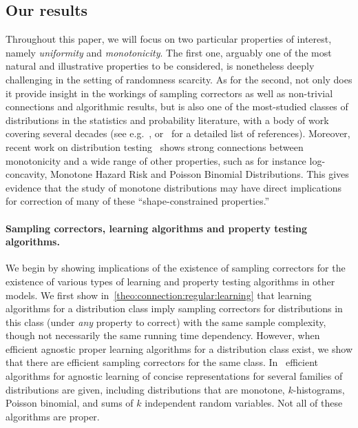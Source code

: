 \subsection{Our results}

Throughout this paper, we will focus on two particular properties of interest, 
namely \emph{uniformity} and \emph{monotonicity}. 
The first one, arguably one of the most natural and illustrative properties to be considered, 
is nonetheless deeply challenging in the setting of randomness scarcity. As for the second, 
not only does it provide insight in the workings of sampling correctors as well as non-trivial connections and algorithmic results, 
but is also one of the most-studied classes of distributions in the statistics and probability literature, with a body of work covering several decades (see 
e.g.~\cite{Grenander:56,Birge:87,BKR:04,DDS:12}, or~\cite{DDSVV:13} for a detailed list of references). 
Moreover, recent work on distribution testing~\cite{DDSVV:13,CDGR:16} shows strong 
connections between monotonicity and a wide range of other properties, 
such as for instance log-concavity, Monotone Hazard Risk and Poisson Binomial Distributions. 
This gives evidence that the study of monotone distributions may have direct implications for 
correction of many of these ``shape-constrained properties.''

\paragraph{Sampling correctors, learning algorithms and property testing algorithms.}
We begin by showing implications of the existence of
sampling correctors for the existence of various types of learning and property
testing algorithms in other 
models. We first show in~\cref{theo:connection:regular:learning} that learning algorithms for a distribution class
imply sampling correctors for distributions in this class (under
 \emph{any} property to correct) with the same sample complexity,
though not necessarily the same running time dependency.  
However,  when efficient agnostic proper
learning algorithms for a distribution class
exist, {we show that} there are efficient sampling correctors 
for the same class.
In~\cite{Birge:87,CDSS:14} efficient algorithms for agnostic learning of
concise representations
for several families of distributions are given, including distributions
that are monotone, $k$-histograms, Poisson binomial, and sums of $k$ independent
random variables.  Not all of these algorithms are proper. 

